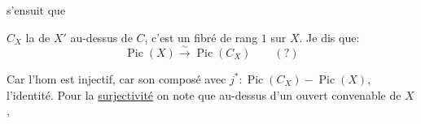  s'ensuit que

 $C_X$ la  de $X'$ au-dessus de $C$,
c'est un fibré  de rang $1$ sur $X$.
Je dis que:
\[
\operatorname{Pic}(X)\overset{\sim}{\longrightarrow}\operatorname{Pic}(C_X)\qquad(?)
\]


Car l'hom est  injectif, car son composé avec
$j^*:\operatorname{Pic}(C_X)\mathbin{-}\operatorname{Pic}(X)$,
 l'identité. Pour la \uline{surjectivité} on note que au-dessus
d'un ouvert convenable de $X$,

